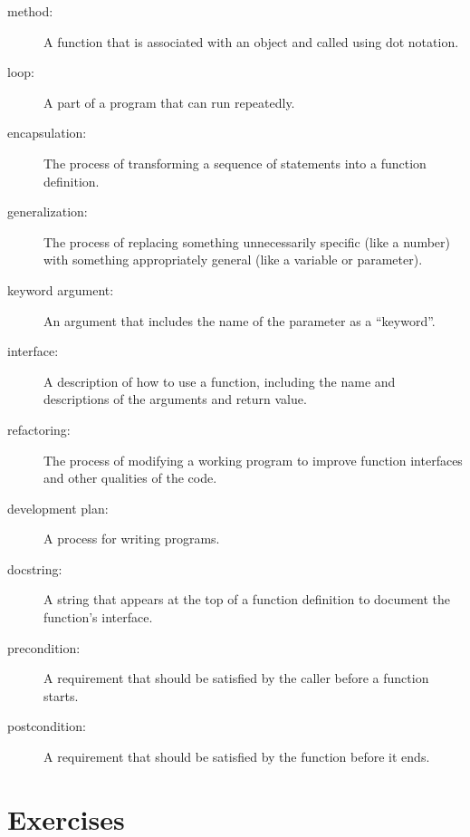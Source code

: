 \documentclass[10pt]{book}
\begin{document}
\begin{description}

\item[method:] A function that is associated with an object and called
using dot notation.

\item[loop:] A part of a program that can run repeatedly.

\item[encapsulation:] The process of transforming a sequence of
statements into a function definition.

\item[generalization:] The process of replacing something
unnecessarily specific (like a number) with something appropriately
general (like a variable or parameter).

\item[keyword argument:] An argument that includes the name of
the parameter as a ``keyword''.

\item[interface:] A description of how to use a function, including
the name and descriptions of the arguments and return value.

\item[refactoring:] The process of modifying a working program to
  improve function interfaces and other qualities of the code.

\item[development plan:] A process for writing programs.

\item[docstring:] A string that appears at the top of a function
  definition to document the function's interface. 

\item[precondition:] A requirement that should be satisfied by
the caller before a function starts.

\item[postcondition:] A requirement that should be satisfied by
the function before it ends.

\end{description}


\section{Exercises}
\end{document}
